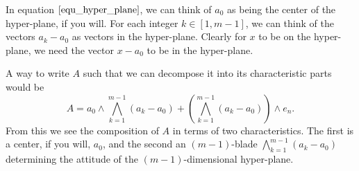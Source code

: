 \documentclass[12pt]{article}
\begin{document}
In equation $\eqref{equ_hyper_plane}$, we can think of $a_0$ as being the center
of the hyper-plane, if you will.  For each integer $k\in[1,m-1]$, we can think of
the vectors $a_k-a_0$ as vectors in the hyper-plane.  Clearly for $x$ to be on
the hyper-plane, we need the vector $x-a_0$ to be in the hyper-plane.

A way to write $A$ such that we can decompose it into its characteristic parts
would be
\begin{equation*}
A = a_0\wedge\bigwedge_{k=1}^{m-1}(a_k-a_0) + \left(\bigwedge_{k=1}^{m-1}(a_k-a_0)\right)\wedge e_n.
\end{equation*}
From this we see the composition of $A$ in terms of two characteristics.  The first
is a center, if you will, $a_0$, and the second an $(m-1)$-blade $\bigwedge_{k=1}^{m-1}(a_k-a_0)$ determining
the attitude of the $(m-1)$-dimensional hyper-plane.




\end{document}
